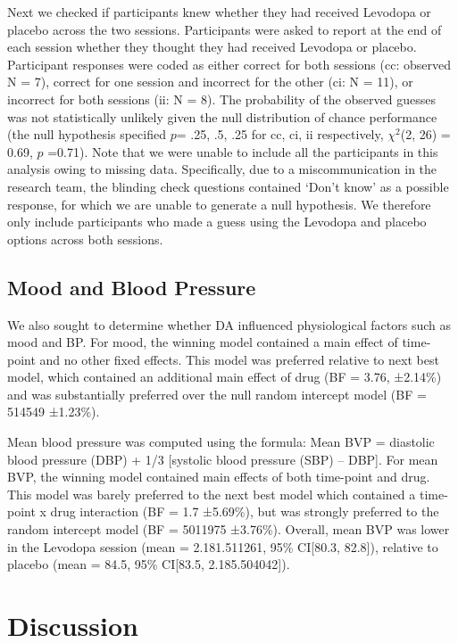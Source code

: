 \documentclass{article}
\begin{document}
Next we checked if participants knew whether they had received Levodopa
or placebo across the two sessions. Participants were asked to report at
the end of each session whether they thought they had received Levodopa
or placebo. Participant responses were coded as either correct for both
sessions (cc: observed N = 7), correct for one session and incorrect for
the other (ci: N = 11), or incorrect for both sessions (ii: N = 8). The
probability of the observed guesses was not statistically unlikely given
the null distribution of chance performance (the null hypothesis
specified \(p\)= .25, .5, .25 for cc, ci, ii respectively, \(\chi^2\)(2,
26) = 0.69, \(p\) =0.71). Note that we were unable to include all the
participants in this analysis owing to missing data. Specifically, due
to a miscommunication in the research team, the blinding check questions
contained `Don't know' as a possible response, for which we are unable
to generate a null hypothesis. We therefore only include participants
who made a guess using the Levodopa and placebo options across both
sessions.

\hypertarget{mood-and-blood-pressure}{%
\subsection{Mood and Blood Pressure}\label{mood-and-blood-pressure}}

We also sought to determine whether DA influenced physiological factors
such as mood and BP. For mood, the winning model contained a main effect
of time-point and no other fixed effects. This model was preferred
relative to next best model, which contained an additional main effect
of drug (BF = 3.76, ±2.14\%) and was substantially preferred over the
null random intercept model (BF = 514549 ±1.23\%).

Mean blood pressure was computed using the formula: Mean BVP = diastolic
blood pressure (DBP) + 1/3 {[}systolic blood pressure (SBP) -- DBP{]}.
For mean BVP, the winning model contained main effects of both
time-point and drug. This model was barely preferred to the next best
model which contained a time-point x drug interaction (BF = 1.7
±5.69\%), but was strongly preferred to the random intercept model (BF =
5011975 ±3.76\%). Overall, mean BVP was lower in the Levodopa session
(mean = 2.181.511261, 95\% CI{[}80.3, 82.8{]}), relative to placebo
(mean = 84.5, 95\% CI{[}83.5, 2.185.504042{]}).

\hypertarget{discussion}{%
\section{Discussion}\label{discussion}}
\end{document}
